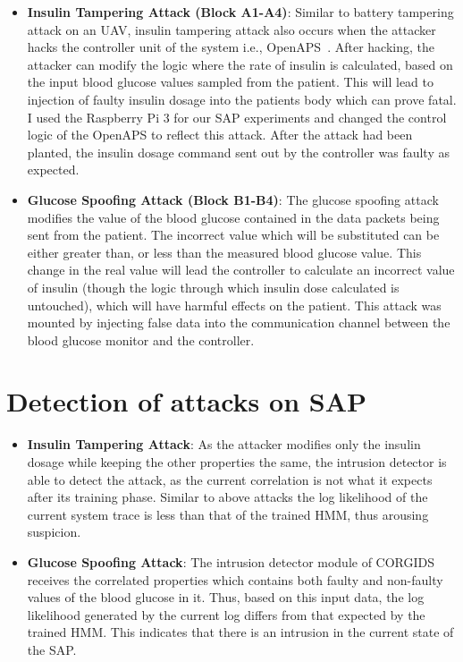 \begin{itemize}
\item {\bf Insulin Tampering Attack (Block A1-A4)}: Similar to battery tampering attack on an UAV, insulin tampering attack also occurs when the attacker hacks the controller unit of the system i.e., OpenAPS~\cite{radcliffe2011hacking}. After hacking, the attacker can modify the logic where the rate of insulin is calculated, based on the input blood glucose values sampled from the patient. This will lead to injection of faulty insulin dosage into the patients body which can prove fatal. I used the Raspberry Pi 3 for our SAP experiments and changed the control logic of the OpenAPS to reflect this attack. After the attack had been planted, the insulin dosage command sent out by the controller was faulty as expected.

\item {\bf Glucose Spoofing Attack (Block B1-B4)}: The glucose spoofing attack modifies the value of the blood glucose contained in the data packets being sent from the patient. The incorrect value which will be substituted can be either greater than, or less than the measured blood glucose value. This change in the real value will lead the controller to calculate an incorrect value of insulin (though the logic through which insulin dose calculated is untouched), which will have harmful effects on the patient. This attack was mounted by injecting false data into the communication channel between the blood glucose monitor and the controller.
\end{itemize}

\section{Detection of attacks on SAP}
\begin{itemize}
\item {\bf Insulin Tampering Attack}: As the attacker modifies only the insulin dosage while keeping the other properties the same, the intrusion detector is able to detect the attack, as the current correlation is not what it expects after its training phase. Similar to above attacks the log likelihood of the current system trace is less than that of the trained HMM, thus arousing suspicion.
\item {\bf Glucose Spoofing Attack}:  The intrusion detector module of CORGIDS receives the correlated properties which contains both faulty and non-faulty values of the blood glucose in it. Thus, based on this input data, the log likelihood generated by the current log differs from that expected by the trained HMM. This indicates that there is an intrusion in the current state of the SAP.
\end{itemize}

